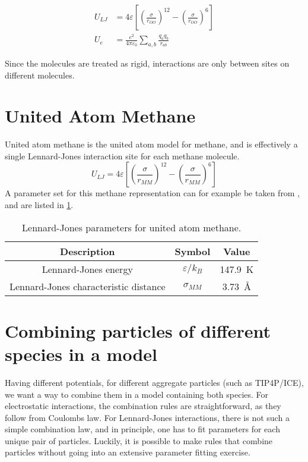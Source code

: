 \begin{align}
	U_{LJ} & = 4\varepsilon\left[\left(\frac{\sigma}{r_{OO}}\right)^{12} - \left(\frac{\sigma}{r_{OO}}\right)^{6}\right]
	\label{eq:part1:lennardjonespotential}
	\\
	U_{\si{\elementarycharge}} & = \frac{\si{\elementarycharge\squared}}{4\pi\varepsilon_0} \sum_{a, b} \frac{q_aq_b}{r_{ab}}
	\label{eq:part1:electrostaticpotential}
\end{align}

Since the molecules are treated as rigid, interactions are only between sites on different molecules. 

\section{United Atom Methane}
United atom methane is the united atom model for methane, and is effectively a single Lennard-Jones interaction site for each methane molecule. 
\begin{equation}
	U_{LJ} = 4\varepsilon\left[\left(\frac{\sigma}{r_{MM}}\right)^{12} - \left(\frac{\sigma}{r_{MM}}\right)^{6}\right]
	\label{eq:part1:lennardjonespotentialmethane}
\end{equation}
A parameter set for this methane representation can for example be taken from \cite{Martin1998}, and are listed in \ref{tb:parameters_unitedatommethane}. 

\begin{table}
\caption{Lennard-Jones parameters for united atom methane.}
\label{tb:parameters_unitedatommethane}
\begin{center}
\begin{tabular}{c|c|c}
Description & Symbol & Value \\
\hline
Lennard-Jones energy & $\varepsilon/k_B$ & \SI{147.9}{\kelvin} \\
Lennard-Jones characteristic distance & $\sigma_{MM}$ & \SI{3.73}{\angstrom}
\end{tabular}
\end{center}
\end{table}

\section{Combining particles of different species in a model}
Having different potentials, for different aggregate particles (such as TIP4P/ICE), we want a way to combine them in a model containing both species. For electrostatic interactions, the combination rules are straightforward, as they follow from Coulombs law. For Lennard-Jones interactions, there is not such a simple combination law, and in principle, one has to fit parameters for each unique pair of particles. Luckily, it is possible to make rules that combine particles without going into an extensive parameter fitting exercise. 

